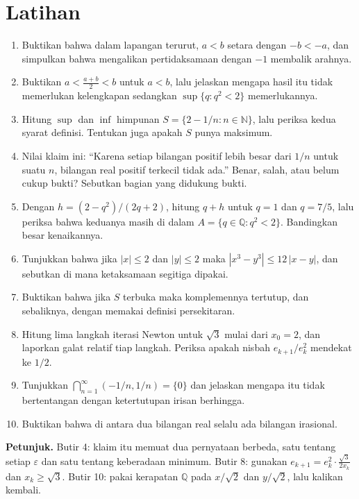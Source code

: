 \section{Latihan}

\begin{latihan}
\begin{enumerate}
  \item Buktikan bahwa dalam lapangan terurut, $a<b$ setara dengan $-b<-a$, dan
        simpulkan bahwa mengalikan pertidaksamaan dengan $-1$ membalik arahnya.
  \item Buktikan $a<\frac{a+b}{2}<b$ untuk $a<b$, lalu jelaskan mengapa hasil itu tidak
        memerlukan kelengkapan sedangkan $\sup\{q:q^2<2\}$ memerlukannya.
  \item Hitung $\sup$ dan $\inf$ himpunan $S=\{2-1/n : n\in\mathbb{N}\}$, lalu periksa
        kedua syarat definisi. Tentukan juga apakah $S$ punya maksimum.
  \item Nilai klaim ini: ``Karena setiap bilangan positif lebih besar dari $1/n$ untuk
        suatu $n$, bilangan real positif terkecil tidak ada.'' Benar, salah, atau belum
        cukup bukti? Sebutkan bagian yang didukung bukti.
  \item Dengan $h=(2-q^2)/(2q+2)$, hitung $q+h$ untuk $q=1$ dan $q=7/5$, lalu periksa
        bahwa keduanya masih di dalam $A=\{q\in\mathbb{Q}:q^2<2\}$. Bandingkan besar
        kenaikannya.
  \item Tunjukkan bahwa jika $|x|\le 2$ dan $|y|\le 2$ maka
        $|x^3-y^3|\le 12\,|x-y|$, dan sebutkan di mana ketaksamaan segitiga dipakai.
  \item Buktikan bahwa jika $S$ terbuka maka komplemennya tertutup, dan sebaliknya,
        dengan memakai definisi persekitaran.
  \item Hitung lima langkah iterasi Newton untuk $\sqrt{3}$ mulai dari $x_0=2$, dan
        laporkan galat relatif tiap langkah. Periksa apakah nisbah $e_{k+1}/e_k^2$
        mendekat ke $1/2$.
  \item Tunjukkan $\bigcap_{n=1}^{\infty}(-1/n,1/n)=\{0\}$ dan jelaskan mengapa itu tidak
        bertentangan dengan ketertutupan irisan berhingga.
  \item Buktikan bahwa di antara dua bilangan real selalu ada bilangan irasional.
\end{enumerate}

\noindent\textbf{Petunjuk.} Butir 4: klaim itu memuat dua pernyataan berbeda, satu
tentang setiap $\varepsilon$ dan satu tentang keberadaan minimum. Butir 8: gunakan
$e_{k+1}=e_k^2\cdot\frac{\sqrt3}{2x_k}$ dan $x_k\ge\sqrt3$. Butir 10: pakai kerapatan
$\mathbb{Q}$ pada $x/\sqrt2$ dan $y/\sqrt2$, lalu kalikan kembali.
\end{latihan}

